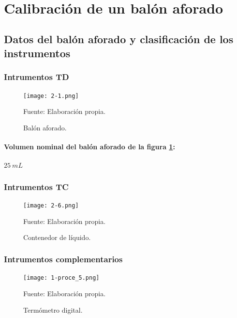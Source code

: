 \documentclass[12pt,letterpaper]{exam}
\begin{document}
\section{Calibración de un balón aforado}

\subsection{Datos del balón aforado y clasificación de los instrumentos}

\begin{multicols}{2}

\subsubsection*{Intrumentos TD}


\begin{figure}[H]
\centering
\texttt{[image: 2-1.png]}
\caption{Balón aforado.}
\begin{center}
Fuente: Elaboración propia.
\end{center}
\label{fig:balón_con_tapa-2}
\end{figure}

\paragraph{Volumen nominal del balón aforado de la figura \ref{fig:balón_con_tapa-2}:} $25 \ mL$


\subsubsection*{Intrumentos TC}

\begin{figure}[H]
\centering
\texttt{[image: 2-6.png]}
\caption{Contenedor de líquido.}
\begin{center}
Fuente: Elaboración propia.
\end{center}
\label{fig:Tanque-2}
\end{figure}


\subsubsection*{Intrumentos complementarios}

\begin{figure}[H]
\centering
\texttt{[image: 1-proce\_5.png]}
\caption{Termómetro digital.}
\begin{center}
Fuente: Elaboración propia.
\end{center}
\label{fig:Termómetro}
\end{figure}



\end{multicols}
\end{document}
